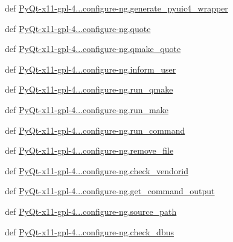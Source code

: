 \begin{DoxyCompactItemize}
\item 
def \hyperlink{namespacePyQt-x11-gpl-4_811_82_1_1configure-ng_a2b570c63626d1d7123eab8d69187e5ae}{Py\+Qt-\/x11-\/gpl-\/4...\+configure-\/ng.\+generate\+\_\+pyuic4\+\_\+wrapper}
\item 
def \hyperlink{namespacePyQt-x11-gpl-4_811_82_1_1configure-ng_a7473c4ca4d59a8b58add7fb4eb35b3fa}{Py\+Qt-\/x11-\/gpl-\/4...\+configure-\/ng.\+quote}
\item 
def \hyperlink{namespacePyQt-x11-gpl-4_811_82_1_1configure-ng_aa0bb0f1abeff584655057450f38e0b1a}{Py\+Qt-\/x11-\/gpl-\/4...\+configure-\/ng.\+qmake\+\_\+quote}
\item 
def \hyperlink{namespacePyQt-x11-gpl-4_811_82_1_1configure-ng_aa0127c7e4d1567fa51c28bccf7345cb7}{Py\+Qt-\/x11-\/gpl-\/4...\+configure-\/ng.\+inform\+\_\+user}
\item 
def \hyperlink{namespacePyQt-x11-gpl-4_811_82_1_1configure-ng_a5f1cb3fd0035af51cb0748b88d561f72}{Py\+Qt-\/x11-\/gpl-\/4...\+configure-\/ng.\+run\+\_\+qmake}
\item 
def \hyperlink{namespacePyQt-x11-gpl-4_811_82_1_1configure-ng_a96462e6df602133502e315304d1ad04d}{Py\+Qt-\/x11-\/gpl-\/4...\+configure-\/ng.\+run\+\_\+make}
\item 
def \hyperlink{namespacePyQt-x11-gpl-4_811_82_1_1configure-ng_a41ba68e1d71f5d0d6b843fb87acc5608}{Py\+Qt-\/x11-\/gpl-\/4...\+configure-\/ng.\+run\+\_\+command}
\item 
def \hyperlink{namespacePyQt-x11-gpl-4_811_82_1_1configure-ng_acaa08649ca4fdb852f4586db307a1d2a}{Py\+Qt-\/x11-\/gpl-\/4...\+configure-\/ng.\+remove\+\_\+file}
\item 
def \hyperlink{namespacePyQt-x11-gpl-4_811_82_1_1configure-ng_aa30aeb76be6f12c21ce35cbd134ab9ca}{Py\+Qt-\/x11-\/gpl-\/4...\+configure-\/ng.\+check\+\_\+vendorid}
\item 
def \hyperlink{namespacePyQt-x11-gpl-4_811_82_1_1configure-ng_a86b2ff52bc434d58a64ef9ba96315336}{Py\+Qt-\/x11-\/gpl-\/4...\+configure-\/ng.\+get\+\_\+command\+\_\+output}
\item 
def \hyperlink{namespacePyQt-x11-gpl-4_811_82_1_1configure-ng_ad5863a5574f3b33fcd407945bd2dd002}{Py\+Qt-\/x11-\/gpl-\/4...\+configure-\/ng.\+source\+\_\+path}
\item 
def \hyperlink{namespacePyQt-x11-gpl-4_811_82_1_1configure-ng_ad294d0907136904f4b902cf7f2076b3e}{Py\+Qt-\/x11-\/gpl-\/4...\+configure-\/ng.\+check\+\_\+dbus}
\item 

\end{DoxyCompactItemize}
